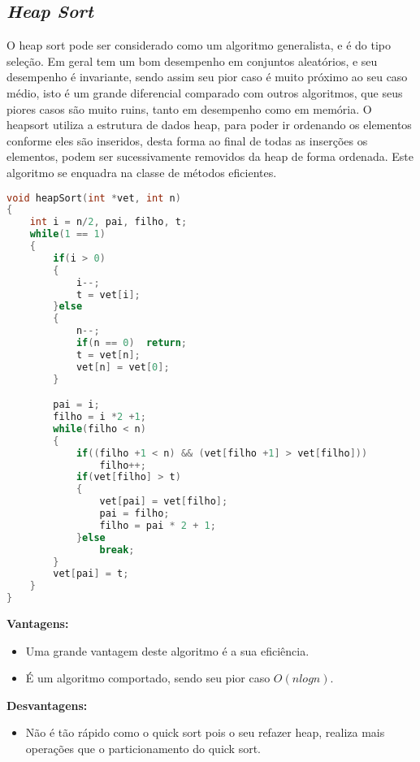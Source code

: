 \documentclass[
	12pt,				%
	oneside,			%
	a4paper,			%
	english,			%
	brazil,				%
	]{article}
\begin{document}
\subsection{\textit{Heap Sort}}
O heap sort pode ser considerado como um algoritmo generalista, e é do tipo seleção. Em geral tem um bom desempenho em conjuntos aleatórios, e seu desempenho 
é invariante, sendo assim seu pior caso é muito próximo ao seu caso médio, isto  é um grande diferencial comparado com outros algoritmos, que seus piores casos são
muito ruins, tanto em desempenho como em memória. O heapsort utiliza a estrutura de dados heap, para poder ir ordenando os elementos conforme eles são inseridos, 
desta forma ao final de todas as inserções os elementos, podem ser sucessivamente removidos da heap de forma ordenada. Este algoritmo se enquadra na classe de métodos eficientes.\cite{Heap}\cite{Heapp}
\begin{lstlisting}[language=C, caption=Estrutura \textit{Heap}]
void heapSort(int *vet, int n)
{
	int i = n/2, pai, filho, t;
	while(1 == 1)
	{
		if(i > 0)
		{
			i--;
			t = vet[i];
		}else
		{
			n--;
			if(n == 0)	return;
			t = vet[n];
			vet[n] = vet[0];
		}

		pai = i;
		filho = i *2 +1;
		while(filho < n)
		{
			if((filho +1 < n) && (vet[filho +1] > vet[filho]))
				filho++;
			if(vet[filho] > t)
			{
				vet[pai] = vet[filho];
				pai = filho;
				filho = pai * 2 + 1;
			}else
				break;
		}
		vet[pai] = t;
	}
}
\end{lstlisting}
\textbf{Vantagens:}
\begin{itemize}
 \item Uma grande vantagem deste algoritmo é a sua eficiência.
 \item É um algoritmo comportado, sendo seu pior caso \begin{math} O(n logn)\end{math}.
\end{itemize}
\textbf{Desvantagens:}
\begin{itemize}
 \item Não é tão rápido como o quick sort pois o seu refazer heap, realiza mais operações que o particionamento do quick sort.
\end{itemize}
\end{document}
